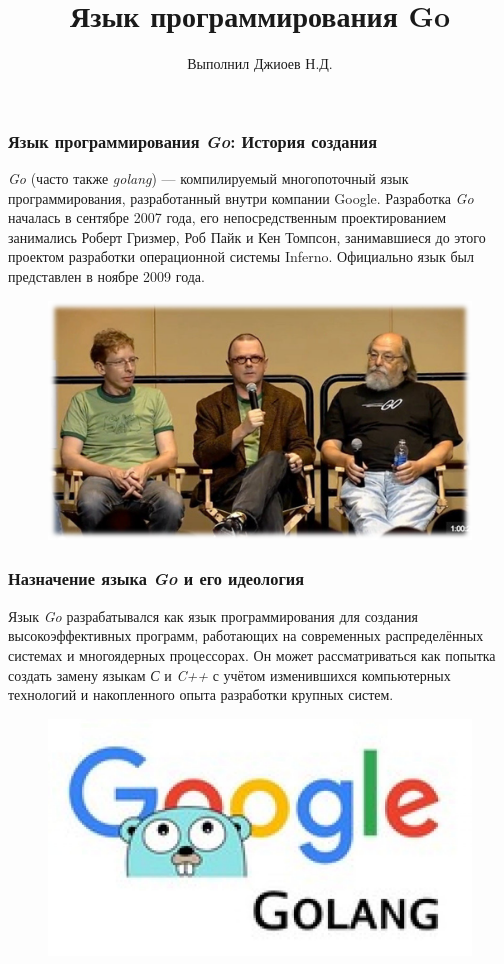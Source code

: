 \documentclass[11pt]{beamer}
\begin{document}
\title{Язык программирования Go}
\subtitle{Выполнил Джиоев Н.Д.}
\frame{\titlepage}
\begin{frame}
\frametitle{Язык программирования \textit{Go}: История создания}
\textit{Go} (часто также \textit{golang}) — компилируемый многопоточный язык программирования, разработанный внутри компании Google. Разработка \textit{Go} началась в сентябре 2007 года, его непосредственным проектированием занимались Роберт Гризмер, Роб Пайк и Кен Томпсон, занимавшиеся до этого проектом разработки операционной системы Inferno. Официально язык был представлен в ноябре 2009 года.
\begin{figure}
    \centering
    \includegraphics[width=0.6\linewidth]{image16.png}
\end{figure}
\end{frame}
\begin{frame}
\frametitle{Назначение языка \textit{Go} и его идеология}
Язык \textit{Go} разрабатывался как язык программирования для создания высокоэффективных программ, работающих на современных распределённых системах и многоядерных процессорах. Он может рассматриваться как попытка создать замену языкам \textit{С} и \textit{C++} с учётом изменившихся компьютерных технологий и накопленного опыта разработки крупных систем. 
\begin{figure}
    \centering
    \includegraphics[width=0.7\linewidth]{image17.png}
\end{figure}
\end{frame}
\end{document}
